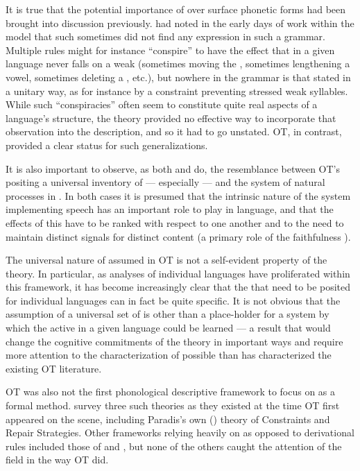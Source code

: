 It is true that the potential importance of  over surface
phonetic forms had been brought into discussion previously.
\citet{kisseberth:conspiracies} had noted in the early days of work
within the \textsl{} model that such  sometimes did not
find any expression in such a grammar. Multiple rules might for
instance ``conspire'' to have the effect that  in a given
language never falls on a weak  (sometimes moving the ,
sometimes lengthening a vowel, sometimes deleting a , etc.),
but nowhere in the grammar is that stated in a unitary way, as for
instance by a constraint preventing stressed weak syllables. While
such ``conspiracies'' often seem to constitute quite real aspects of a
language's structure, the theory provided no effective way to
incorporate that observation into the description, and so it had to go
unstated. OT, in {contrast}, provided a clear status for such
generalizations.

It is also important to observe, as both
\citet{prince:smolensky:optimality} and
\citet{donegan.stampe09:hypotheses} do, the resemblance between OT's
positing a universal inventory of  --- especially
  --- and the system of natural processes in
 . In both
cases it is presumed that the intrinsic nature of the system
implementing speech has an important role to play in language, and
that the effects of this have to be ranked with respect to one another
and to the need to maintain distinct signals for distinct content (a
primary role of the faithfulness ).

The universal nature of  assumed in OT is not a
self-evident property of the theory. In particular, as analyses of
individual languages have proliferated within this framework, it has
become increasingly clear that the  that need to be posited
for individual languages can in fact be quite specific. It is not
obvious that the assumption of a universal set of  is other
than a place-holder for a system by which the  active in a
given language could be learned --- a result that would {change} the
cognitive commitments of the theory in important ways and require more
attention to the characterization of possible  than has
characterized the existing OT literature.

OT was also not the first phonological descriptive framework to focus
on  as a formal method.
\citet{paradis.lacharite93:introduction} survey three such theories as
they existed at the time OT first appeared on the scene, including
Paradis's own (\citeyear{paradis87:constraints.and.repairs}) theory of
Constraints and Repair Strategies. Other frameworks relying heavily on
 as opposed to derivational rules included those of
\citet{vennemann88:preference.laws} and
\citet{burzio94:english.stress}, but none of the others caught the
attention of the field in the way OT did.

